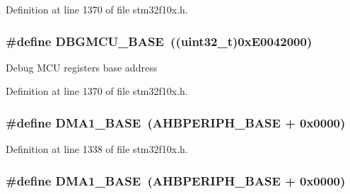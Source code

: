 Definition at line 1370 of file stm32f10x.\+h.

\subsubsection[{\texorpdfstring{D\+B\+G\+M\+C\+U\+\_\+\+B\+A\+SE}{DBGMCU_BASE}}]{\setlength{\rightskip}{0pt plus 5cm}\#define D\+B\+G\+M\+C\+U\+\_\+\+B\+A\+SE~(({\bf uint32\+\_\+t})0x\+E0042000)}\hypertarget{group___peripheral__memory__map_ga4adaf4fd82ccc3a538f1f27a70cdbbef}{}\label{group___peripheral__memory__map_ga4adaf4fd82ccc3a538f1f27a70cdbbef}
Debug M\+CU registers base address 

Definition at line 1370 of file stm32f10x.\+h.

\subsubsection[{\texorpdfstring{D\+M\+A1\+\_\+\+B\+A\+SE}{DMA1_BASE}}]{\setlength{\rightskip}{0pt plus 5cm}\#define D\+M\+A1\+\_\+\+B\+A\+SE~({\bf A\+H\+B\+P\+E\+R\+I\+P\+H\+\_\+\+B\+A\+SE} + 0x0000)}\hypertarget{group___peripheral__memory__map_gab2d8a917a0e4ea99a22ac6ebf279bc72}{}\label{group___peripheral__memory__map_gab2d8a917a0e4ea99a22ac6ebf279bc72}


Definition at line 1338 of file stm32f10x.\+h.

\subsubsection[{\texorpdfstring{D\+M\+A1\+\_\+\+B\+A\+SE}{DMA1_BASE}}]{\setlength{\rightskip}{0pt plus 5cm}\#define D\+M\+A1\+\_\+\+B\+A\+SE~({\bf A\+H\+B\+P\+E\+R\+I\+P\+H\+\_\+\+B\+A\+SE} + 0x0000)}\hypertarget{group___peripheral__memory__map_gab2d8a917a0e4ea99a22ac6ebf279bc72}{}\label{group___peripheral__memory__map_gab2d8a917a0e4ea99a22ac6ebf279bc72}


